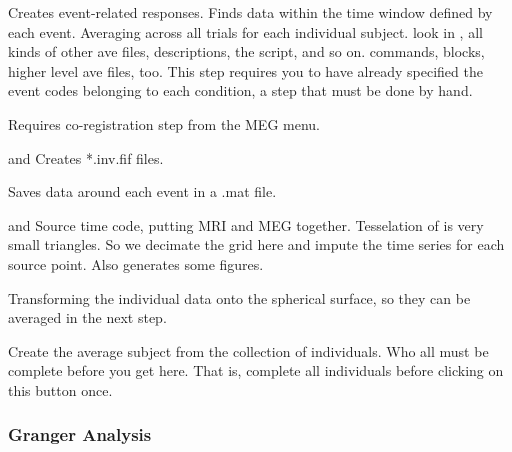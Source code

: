 \documentclass[11pt]{article}
\begin{document}
\begin{itemize}

Creates event-related responses.  Finds data
  within the time window defined by each event.  Averaging across all
  trials for each individual subject.  look in ,
  all kinds of other ave  files, descriptions, the script, and so
  on. commands, blocks, higher
  level ave files, too.  This step requires you to have already specified the
  event codes belonging to each condition, a step that must be done by hand.

%
{}  Requires
co-registration step from the MEG menu.

%
{
  and } Creates *.inv.fif files.

%
{} Saves data
around each event in a .mat file.

%
{ and }
Source time code, putting MRI and MEG together.
  Tesselation of \fs is very small triangles.  So we decimate
  the grid here and impute the time series for each source point.
  Also generates some figures.

  Transforming the individual data onto the
  spherical surface, so they can be averaged in the next step.

%
{} Create the average
subject from the collection of individuals.  Who all must be complete
before you get here.  That is, complete all individuals before
clicking on this button once.

\end{itemize}

\subsubsection{Granger Analysis}
\end{document}
